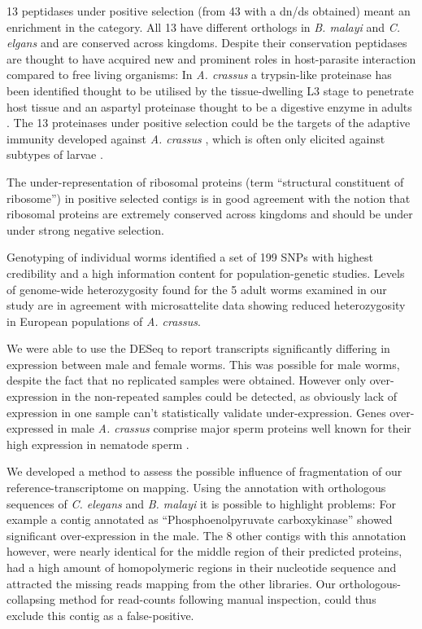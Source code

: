 \documentclass[10pt]{bmc_article}
\newenvironment{bmcformat}{\begin{raggedright}\baselineskip20pt\sloppy\setboolean{publ}{false}}{\end{raggedright}\baselineskip20pt\sloppy}
\begin{document}
\begin{bmcformat}
13 peptidases under positive selection (from 43 with a dn/ds obtained)
meant an enrichment in the category. All 13 have different orthologs
in \textit{B. malayi} and \textit{C. elgans} and are conserved across
kingdoms. Despite their conservation peptidases are thought to have
acquired new and prominent roles in host-parasite interaction compared
to free living organisms: In \textit{A. crassus} a trypsin-like
proteinase has been identified thought to be utilised by the
tissue-dwelling L3 stage to penetrate host tissue and an aspartyl
proteinase thought to be a digestive enzyme in adults
\cite{polzer_identification_1993}. The 13 proteinases under positive
selection could be the targets of the adaptive immunity developed
against \textit{A. crassus} \cite{knopf_migratory_2008,
  knopf_vaccination_2008}, which is often only elicited against
subtypes of larvae \cite{molnar_caps}.

The under-representation of ribosomal proteins (term ``structural
constituent of ribosome'') in positive selected contigs is in good
agreement with the notion that ribosomal proteins are extremely
conserved across kingdoms \cite{pmid9664699} and should be under under
strong negative selection.

Genotyping of individual worms identified a set of 199
SNPs with highest credibility and a high information content for
population-genetic studies. Levels of genome-wide heterozygosity found
for the 5 adult worms examined in our study are in agreement with
microsattelite data \cite{wielgoss_population_2008} showing reduced
heterozygosity in European populations of \textit{A. crassus}.

We were able to use the DESeq \cite{pmid20979621} to report
transcripts significantly differing in expression between male and
female worms. This was possible for male worms, despite the fact that
no replicated samples were obtained. However only over-expression in
the non-repeated samples could be detected, as obviously lack of
expression in one sample can't statistically validate
under-expression. Genes over-expressed in male \textit{A. crassus}
comprise major sperm proteins well known for their high expression in
nematode sperm \cite{pmid15275275}.

We developed a method to assess the possible influence of
fragmentation of our reference-transcriptome on mapping. Using the
annotation with orthologous sequences of \textit{C. elegans} and
\textit{B. malayi} it is possible to highlight problems: For example a
contig annotated as ``Phosphoenolpyruvate carboxykinase'' showed
significant over-expression in the male. The 8 other contigs with this
annotation however, were nearly identical for the middle region of
their predicted proteins, had a high amount of homopolymeric regions in
their nucleotide sequence and attracted the missing reads mapping from
the other libraries. Our orthologous-collapsing method for read-counts
following manual inspection, could thus exclude this contig as a
false-positive.


\end{bmcformat}
\end{document}
